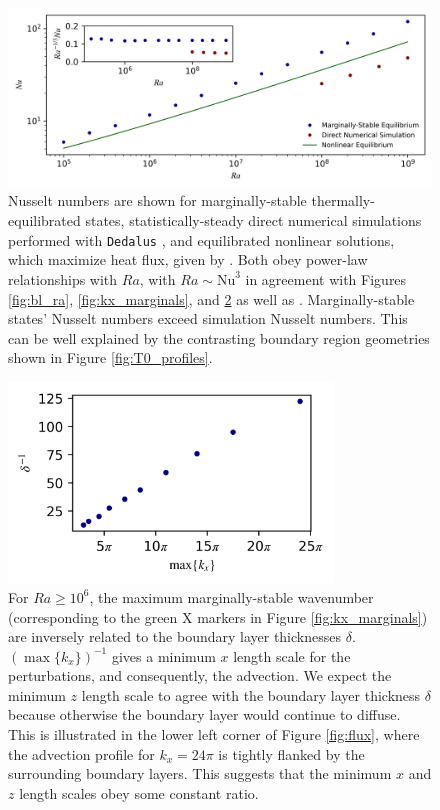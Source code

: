 \documentclass[reprint,amsmath,amssymb,aps]{revtex4-1}
\newcommand\Nu{\mathrm{Nu}}
\begin{document}
\begin{figure}
    \centering
    \includegraphics[width=7.1in]{nu_ra.PNG}
    \caption{Nusselt numbers are shown for marginally-stable thermally-equilibrated states, statistically-steady direct numerical simulations performed with \texttt{Dedalus} \cite{Anders_cd}, and equilibrated nonlinear solutions, which maximize heat flux, given by \cite{Waleffe}. 
    Both obey power-law relationships with $Ra$, with $Ra \sim \Nu^3$ in agreement with Figures \ref{fig:bl_ra}, \ref{fig:kx_marginals}, and \ref{fig:del_inv} as well as \cite{Malkus_1954}. 
    Marginally-stable states' Nusselt numbers exceed simulation Nusselt numbers. 
    This can be well explained by the contrasting boundary region geometries shown in Figure \ref{fig:T0_profiles}.}%
    \label{fig:nu_vs_ra}%
\end{figure}

\begin{figure}
    \centering
    \includegraphics[width=3.4in]{del_kx_inv.png}
    \caption{For $Ra \geq 10^6$, the maximum marginally-stable wavenumber (corresponding to the green X markers in Figure \ref{fig:kx_marginals}) are inversely related to the boundary layer thicknesses $\delta$. 
    $(\max \{ k_x \})^{-1}$ gives a minimum $x$ length scale for the perturbations, and consequently, the advection. 
    We expect the minimum $z$ length scale to agree with the boundary layer thickness $\delta$ because otherwise the boundary layer would continue to diffuse. 
    This is illustrated in the lower left corner of Figure \ref{fig:flux}, where the advection profile for $k_x = 24\pi$ is tightly flanked by the surrounding boundary layers. 
    This suggests that the minimum $x$ and $z$ length scales obey some constant ratio.}
    \label{fig:del_inv}
\end{figure}
\end{document}
